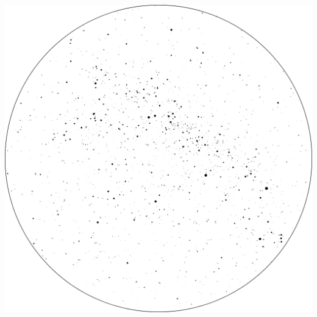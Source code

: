 \documentclass{SAS-class-skygen}
\begin{document}
	\vspace{0.5cm}
    \begin{center}
    \includegraphics[width=\textwidth]{./pics/sky_chart2.png}
    \end{center}
    
    
\end{document}
